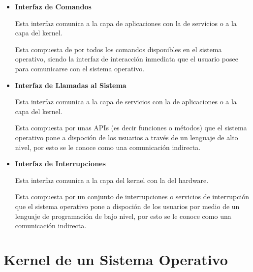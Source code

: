 \documentclass[12pt, fleqn]{report}                             %
\begin{document}
            \begin{itemize}
                \item
                    \textbf{Interfaz de Comandos}

                    Esta interfaz comunica a la capa de aplicaciones con la de
                    servicios o a la capa del kernel.

                    Esta compuesta de por todos los comandos disponibles en el sistema
                    operativo, siendo la interfaz de interacción inmediata que el usuario
                    posee para comunicarse con el sistema operativo.

                \item
                    \textbf{Interfaz de Llamadas al Sistema}

                    Esta interfaz comunica a la capa de servicios con la de
                    aplicaciones o a la capa del kernel.

                    Esta compuesta por unas APIs (es decir funciones o métodos)
                    que el sistema operativo pone a dispoción de los usuarios a
                    través de un lenguaje de alto nivel, por esto se le conoce como una
                    comunicación indirecta.

                \item
                    \textbf{Interfaz de Interrupciones}

                    Esta interfaz comunica a la capa del kernel con la del hardware.

                    Esta compuesta por un conjunto de interrupciones o servicios de 
                    interrupción que el sistema operativo pone a dispoción de los
                    usuarios por medio de un lenguaje de programación de bajo nivel,
                    por esto se le conoce como una comunicación indirecta.

            \end{itemize}





    \chapter{Kernel de un Sistema Operativo}
\end{document}
